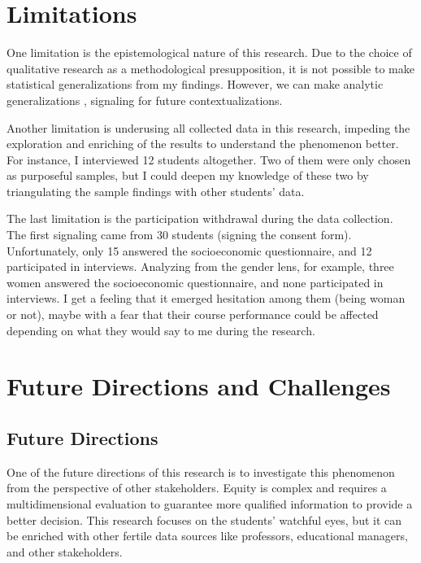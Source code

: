 \section{Limitations}
 \label{conclusions-sec:limitations}

One limitation is the epistemological nature of this research. Due to the choice of qualitative research as a methodological presupposition, it is not possible to make statistical generalizations from my findings. However, we can make analytic generalizations \cite{kennedy:1979}, signaling for future contextualizations.

Another limitation is underusing all collected data in this research, impeding the exploration and enriching of the results to understand the phenomenon better. For instance, I interviewed 12 students altogether. Two of them were only chosen as purposeful samples, but I could deepen my knowledge of these two by triangulating the sample findings with other students' data.

The last limitation is the participation withdrawal during the data collection. The first signaling came from 30 students (signing the consent form). Unfortunately, only 15 answered the socioeconomic questionnaire, and 12 participated in interviews. Analyzing from the gender lens, for example, three women answered the socioeconomic questionnaire, and none participated in interviews. I get a feeling that it emerged hesitation among them (being woman or not), maybe with a fear that their course performance could be affected depending on what they would say to me during the research.

 \section{Future Directions and Challenges}
 \label{conclusions-sec:challenges}
 
\subsection{Future Directions}

One of the future directions of this research is to investigate this phenomenon from the perspective of other stakeholders. Equity is complex and requires a multidimensional evaluation to guarantee more qualified information to provide a better decision. This research focuses on the students' watchful eyes, but it can be enriched with other fertile data sources like professors, educational managers, and other stakeholders.

